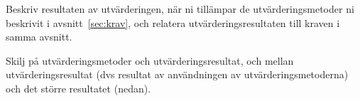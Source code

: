 Beskriv resultaten av utvärderingen, när ni tillämpar de ut\-vär\-de\-rings\-me\-to\-der ni beskrivit i avsnitt~\ref{sec:krav}, och relatera utvärderingsresultaten till kraven i samma avsnitt.

Skilj på utvärderingsmetoder och utvärderingsresultat, och mellan utvärderingsresultat (dvs resultat av användningen av utvärderingsmetoderna) och det större resultatet (nedan).
